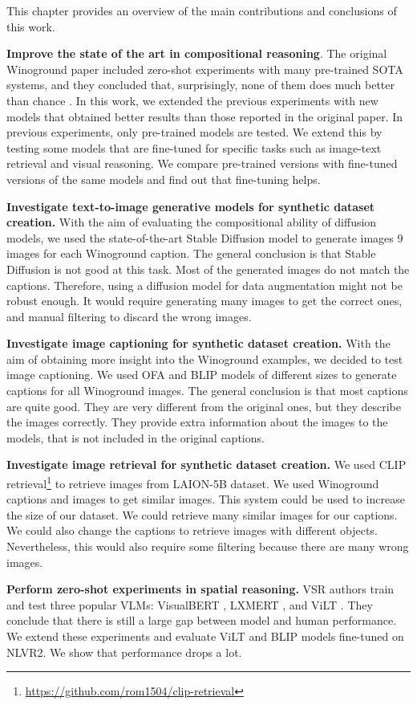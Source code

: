 This chapter provides an overview of the main contributions and conclusions of this work.

\textbf{Improve the state of the art in compositional reasoning}. The original Winoground paper included zero-shot experiments with many pre-trained SOTA systems, and they concluded that, surprisingly, none of them does much better than chance \cite{thrush2022winoground}. In this work, we extended the previous experiments with new models that obtained better results than those reported in the original paper. In previous experiments, only pre-trained models are tested. We extend this by testing some models that are fine-tuned for specific tasks such as image-text retrieval and visual reasoning. We compare pre-trained versions with fine-tuned versions of the same models and find out that fine-tuning helps.

\textbf{Investigate text-to-image generative models for synthetic dataset creation.} With the aim of evaluating the compositional ability of diffusion models, we used the state-of-the-art Stable Diffusion model \cite{rombach2021highresolution} to generate images 9 images for each Winoground caption. The general conclusion is that Stable Diffusion is not good at this task. Most of the generated images do not match the captions. Therefore, using a diffusion model for data augmentation might not be robust enough. It would require generating many images to get the correct ones, and manual filtering to discard the wrong images.

\textbf{Investigate image captioning for synthetic dataset creation.} With the aim of obtaining more insight into the Winoground examples, we decided to test image captioning. We used OFA \cite{wang2022unifying} and BLIP \cite{li2022blip} models of different sizes to generate captions for all Winoground images. The general conclusion is that most captions are quite good. They are very different from the original ones, but they describe the images correctly. They provide extra information about the images to the models, that is not included in the original captions.

\textbf{Investigate image retrieval for synthetic dataset creation.} We used CLIP retrieval\footnote{\url{https://github.com/rom1504/clip-retrieval}} to retrieve images from LAION-5B \cite{schuhmann2022laionb} dataset. We used Winoground captions and images to get similar images. This system could be used to increase the size of our dataset. We could retrieve many similar images for our captions. We could also change the captions to retrieve images with different objects. Nevertheless, this would also require some filtering because there are many wrong images.

\textbf{Perform zero-shot experiments in spatial reasoning.} VSR authors \cite{liu2022visual} train and test three popular VLMs: VisualBERT \cite{li2019visualbert}, LXMERT \cite{tan2020lxmert}, and
ViLT \cite{kim2021vilt}. They conclude that there is still a large gap between model and human performance. We extend these experiments and evaluate ViLT \cite{kim2021vilt} and BLIP \cite{li2022blip} models fine-tuned on NLVR2. We show that performance drops a lot.